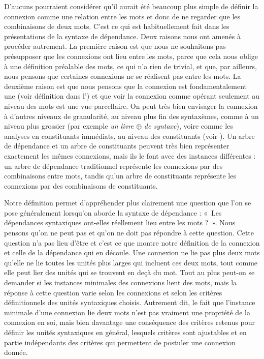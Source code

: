 D’aucuns pourraient considérer qu’il aurait été beaucoup plus simple de définir la connexion comme une relation entre les mots et donc de ne regarder que les combinaisons de deux mots. C’est ce qui est habituellement fait dans les présentations de la syntaxe de dépendance. Deux raisons nous ont amenés à procéder autrement. La première raison est que nous ne souhaitons pas présupposer que les connexions ont lieu entre les mots, parce que cela nous oblige à une définition préalable des mots, ce qui n’a rien de trivial, et que, par ailleurs, nous pensons que certaines connexions ne se réalisent pas entre les mots. La deuxième raison est que nous pensons que la connexion est fondamentalement une   (voir définition dans l’) et que voir la connexion comme opérant seulement au niveau des mots est une vue parcellaire. On peut très bien envisager la connexion à d’autres niveaux de granularité, au niveau plus fin des syntaxèmes, comme à un niveau plus grossier (par exemple \textit{un livre} ${\oplus}$ \textit{de syntaxe}), voire comme les analyses en constituants immédiats, au niveau des constituants (voir ). Un arbre de dépendance et un arbre de constituants peuvent très bien représenter exactement les mêmes connexions, mais ils le font avec des instances différentes : un arbre de dépendance traditionnel représente les connexions par des combinaisons entre mots, tandis qu’un arbre de constituants représente les connexions par des combinaisons de constituants.


Notre définition permet d’appréhender plus clairement une question que l’on se pose généralement lorsqu’on aborde la syntaxe de dépendance : «~Les dépendances syntaxiques ont-elles réellement lieu entre les mots ?~». Nous pensons qu’on ne peut pas et qu’on ne doit pas répondre à cette question. Cette question n’a pas lieu d’être et c’est ce que montre notre définition de la connexion et celle de la dépendance qui en découle. Une connexion ne lie pas plus deux mots qu’elle ne lie toutes les unités plus larges qui incluent ces deux mots, tout comme elle peut lier des unités qui se trouvent en deçà du mot. Tout au plus peut-on se demander si les instances minimales des connexions lient des mots, mais la réponse à cette question varie selon les connexions et selon les critères définitionnels des unités syntaxiques choisis. Autrement dit, le fait que l’instance minimale d’une connexion lie deux mots n’est pas vraiment une propriété de la connexion en soi, mais bien davantage une conséquence des critères retenus pour définir les unités syntaxiques en général, lesquels critères sont ajustables et en partie indépendants des critères qui permettent de postuler une connexion donnée.


